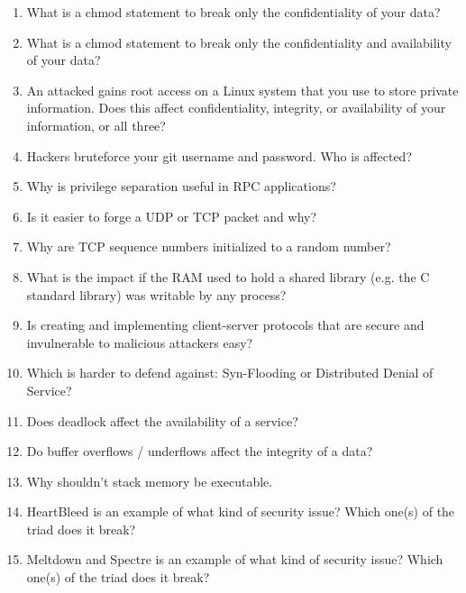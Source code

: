 \begin{enumerate}
\item What is a chmod statement to break only the confidentiality of your data?

\item What is a chmod statement to break only the confidentiality and availability of your data?

\item An attacked gains root access on a Linux system that you use to store private information. Does this affect confidentiality, integrity, or availability of your information, or all three?

\item Hackers bruteforce your git username and password. Who is affected?

\item Why is privilege separation useful in RPC applications?

\item Is it easier to forge a UDP or TCP packet and why? 

\item Why are TCP sequence numbers initialized to a random number?

\item What is the impact if the RAM used to hold a shared library (e.g. the C standard library) was writable by any process?

\item Is creating and implementing client-server protocols that are secure and invulnerable to malicious attackers easy?

\item Which is harder to defend against: Syn-Flooding or Distributed Denial of Service?

\item Does deadlock affect the availability of a service?

\item Do buffer overflows / underflows affect the integrity of a data?

\item Why shouldn't stack memory be executable.

\item HeartBleed is an example of what kind of security issue? Which one(s) of the triad does it break?

\item Meltdown and Spectre is an example of what kind of security issue? Which one(s) of the triad does it break?

\end{enumerate}



